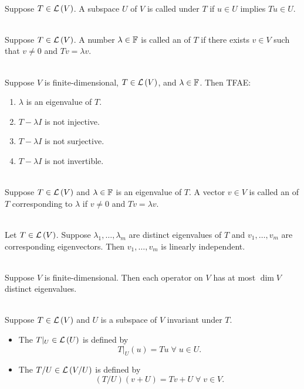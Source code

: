 \\
Suppose $T \in \mathcal{L}\left({V}\right)$. A subspace $U$ of $V$ is called  under $T$ if $u \in U$ implies $Tu \in U$.

\\
Suppose $T \in \mathcal{L}\left({V}\right)$. A number $\lambda \in \mathbb{F}$ is called an  of $T$ if there exists $v \in V$ such that $v \neq 0$ and $Tv = \lambda v$.

\\
Suppose $V$ is finite-dimensional, $T \in \mathcal{L}\left({V}\right)$, and $\lambda \in \mathbb{F}$. Then TFAE:
\begin{enumerate}[label=(\alph*)]
    \item $\lambda$ is an eigenvalue of $T$.
    \item $T - \lambda I$ is not injective.
    \item $T - \lambda I$ is not surjective.
    \item $T - \lambda I$ is not invertible.
\end{enumerate}

\\
Suppose $T \in \mathcal{L}\left({V}\right)$ and $\lambda \in \mathbb{F}$ is an eigenvalue of $T$. A vector $v \in V$ is called an  of $T$ corresponding to $\lambda$ if $v \neq 0$ and $Tv = \lambda v$.

\\
Let $T \in \mathcal{L}\left({V}\right)$. Suppose $\lambda_1, \dots, \lambda_m$ are distinct eigenvalues of $T$ and $v_1, \dots, v_m$ are corresponding eigenvectors. Then $v_1, \dots, v_m$ is linearly independent.

\\
Suppose $V$ is finite-dimensional. Then each operator on $V$ has at most $\dim V$ distinct eigenvalues.

\\
Suppose $T \in \mathcal{L}\left({V}\right)$ and $U$ is a subspace of $V$ invariant under $T$. 
\begin{itemize}
    \item The  $T|_U \in \mathcal{L}\left({U}\right)$ is defined by 
    $$T|_U(u) = Tu \; \forall \; u \in U.$$
    \item The  $T/U \in \mathcal{L}\left({V/U}\right)$ is defined by
    $$(T/U)(v+U) = Tv + U \; \forall \; v \in V.$$
\end{itemize}